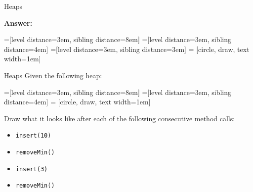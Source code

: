 \documentclass[9pt]{beamer}
\begin{document}
\begin{frame}[fragile]{Heaps}

  {\bf Answer:}

  =[level distance=3em, sibling distance=8em]
  =[level distance=3em, sibling distance=4em]
  =[level distance=3em, sibling distance=3em]
   = [circle, draw, text width=1em]

\end{frame}

\begin{frame}[fragile]{Heaps}
  Given the following heap:

  =[level distance=3em, sibling distance=8em]
  =[level distance=3em, sibling distance=4em]
   = [circle, draw, text width=1em]


  Draw what it looks like after each of the following consecutive method
  calls:
  \begin{itemize}
    \item
      {\tt insert(10)}
    \item
      {\tt removeMin()}
    \item
      {\tt insert(3)}
    \item
      {\tt removeMin()}
  \end{itemize}
\end{frame}
\end{document}
